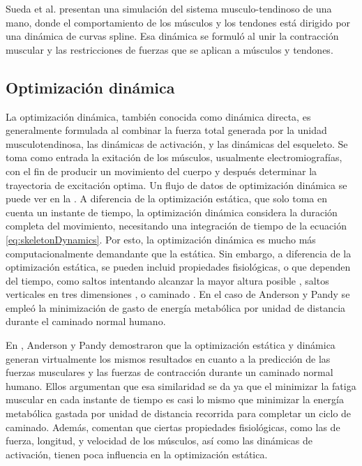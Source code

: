 Sueda et al. \citep{sueda2008musculotendon} presentan una simulación del sistema musculo-tendinoso de una mano, donde el comportamiento de los músculos y los tendones está dirigido por una dinámica de curvas spline. Esa dinámica se formuló al unir la contracción muscular y las restricciones de fuerzas que se aplican a músculos y tendones. 

\subsection{Optimización dinámica}

La optimización dinámica, también conocida como dinámica directa, es generalmente formulada al combinar la fuerza total generada por la unidad musculotendinosa, las dinámicas de activación, y las dinámicas del esqueleto. Se toma como entrada la exitación de los músculos, usualmente electromiografías, con el fin de producir un movimiento del cuerpo y después determinar la trayectoria de excitación optima. Un flujo de datos de optimización dinámica se puede ver en la . A diferencia de la optimización estática, que solo toma en cuenta un instante de tiempo, la optimización dinámica considera la duración completa del movimiento, necesitando una integración de tiempo de la ecuación \ref{eq:skeletonDynamics}. Por esto, la optimización dinámica es mucho más computacionalmente demandante que la estática. Sin embargo, a diferencia de la optimización estática, se pueden incluid propiedades fisiológicas, o que dependen del tiempo, como saltos intentando alcanzar la mayor altura posible \citep{pandy1990optimal}, saltos verticales en tres dimensiones \citep{anderson1999dynamic}, o caminado \citep{anderson2001dynamic}. En el caso de Anderson y Pandy \citep{anderson2001dynamic, anderson2001static} se empleó la minimización de gasto de energía metabólica por unidad de distancia durante el caminado normal humano. 

En \citep{anderson2001static}, Anderson y Pandy demostraron que la optimización estática y dinámica generan virtualmente los mismos resultados en cuanto a la predicción de las fuerzas musculares y las fuerzas de contracción durante un caminado normal humano. Ellos argumentan que esa similaridad se da ya que el minimizar la fatiga muscular en cada instante de tiempo es casi lo mismo que minimizar la energía metabólica gastada por unidad de distancia recorrida para completar un ciclo de caminado. Además, comentan que ciertas propiedades fisiológicas, como las de fuerza, longitud, y velocidad de los músculos, así como las dinámicas de activación, tienen poca influencia en la optimización estática.

